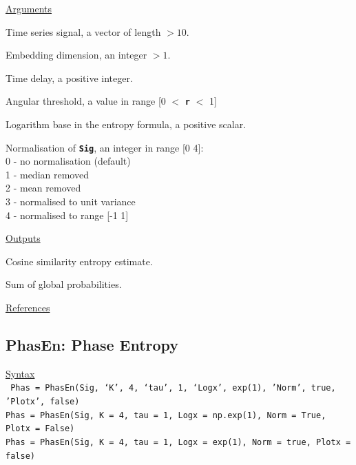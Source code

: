 \documentclass[12pt, a4paper, titlepage, openany]{book}
\begin{document}
\noindent \ul{Arguments}
\begin{description}[labelsep=1cm, labelwidth=2cm, nosep, style=multiline,leftmargin=3cm]\footnotesize
\item[\texttt{Sig}]		Time series signal, a vector of length $> 10$.
\item[\texttt{m}]		Embedding dimension, an integer $> 1$.
\item[\texttt{tau}]		Time delay, a positive integer.
\item[\texttt{r}]		Angular threshold, a value in range [0 $<$ \texttt{\textbf{r}} $<$ 1]
\item[\texttt{Logx}]	Logarithm base in the entropy formula, a positive scalar.
\item[\texttt{Norm}]	Normalisation of \texttt{\textbf{Sig}}, an integer in range [0 4]:\\
						0 - no normalisation (default)\\
						1 - median removed\\
						2 - mean removed\\
						3 - normalised to unit variance\\
						4 - normalised to range [-1 1]
\end{description}

\noindent \ul{Outputs}
\begin{description}[labelsep=1cm, labelwidth=2cm, nosep, style=multiline,leftmargin=3cm]\footnotesize
\item[\texttt{CoSi}]	Cosine similarity entropy  estimate.
\item[\texttt{Bm}]	Sum of global probabilities.
\end{description}

\noindent \ul{References}\hspace{1cm}
\cite{CoSi1}



\newpage
\subsection{\normalsize PhasEn: \hspace{15mm} Phase Entropy}\label{PhasEn}
\noindent\ul{Syntax} \vspace{6mm} \\ \noindent \texttt{\footnotesize
Phas = PhasEn(Sig, ‘K’, 4, ‘tau’, 1, ‘Logx’, exp(1), 'Norm', true, 'Plotx', false) \\
Phas = PhasEn(Sig, K = 4, tau = 1, Logx = np.exp(1), Norm = True, Plotx = False) \\
Phas = PhasEn(Sig, K = 4, tau = 1, Logx = exp(1), Norm = true, Plotx = false)}
\end{document}
